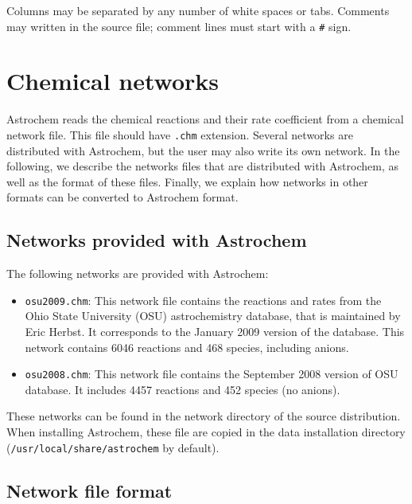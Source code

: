 \documentclass[a4paper,12pt]{article}
\begin{document}
\noindent
Columns may be separated by any number of white spaces or
tabs. Comments may written in the source file; comment lines must
start with a \verb=#= sign.

\section{Chemical networks}
\label{sec:chemical-networks}

Astrochem reads the chemical reactions and their rate coefficient from
a chemical network file. This file should have \verb=.chm=
extension. Several networks are distributed with Astrochem, but the
user may also write its own network. In the following, we describe the
networks files that are distributed with Astrochem, as well as the
format of these files. Finally, we explain how networks in other
formats can be converted to Astrochem format.

\subsection{Networks provided with Astrochem}
\label{sec:netw-prov-with}

The following networks are provided with Astrochem:

\begin{itemize}

\item \verb=osu2009.chm=: This network file contains the reactions and
  rates from the Ohio State University (OSU) astrochemistry database, that
  is maintained by Eric Herbst. It corresponds to the January 2009
  version of the database. This network contains 6046 reactions and
  468 species, including anions.

\item \verb=osu2008.chm=: This network file contains the September
  2008 version of OSU database.  It includes 4457 reactions and 452
  species (no anions).

\end{itemize}

These networks can be found in the network directory of the source
distribution. When installing Astrochem, these file are copied in the
data installation directory \\(\verb=/usr/local/share/astrochem= by
default). 

\subsection{Network file format}
\label{sec:network-file-format}
\end{document}
